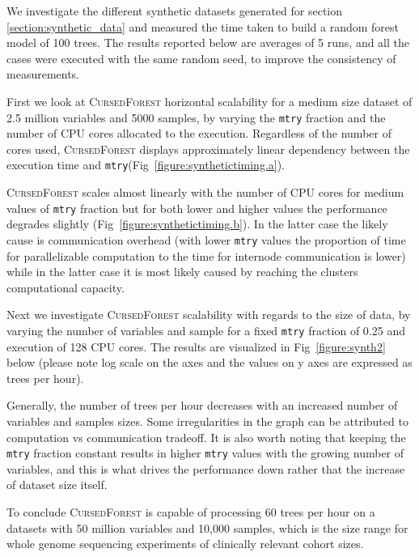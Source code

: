 \documentclass[10pt,letterpaper]{article}
\newcommand{\cursedforest}{\textsc{CursedForest}\xspace}
\newcommand{\mtry}{\texttt{mtry}\xspace}
\begin{document}
We investigate the different synthetic datasets generated for section \ref{section:synthetic_data} and measured the time
taken to build a random forest model of 100 trees. The results reported below are averages of 5 runs, and all the cases
were executed with the same random seed, to improve the consistency of measurements.

First we look at \cursedforest horizontal scalability for a medium size dataset of 2.5 million variables and 5000
samples, by varying the \mtry  fraction and the number of CPU cores allocated to the execution. 
Regardless of the number of cores used, \cursedforest displays approximately linear dependency between the execution
time and \mtry (Fig~\ref{figure:synthetictiming.a}).

\cursedforest scales almost linearly with the number of CPU cores for medium values of \mtry fraction but for both lower
and higher values the performance degrades slightly (Fig~\ref{figure:synthetictiming.b}). In the latter case the likely
cause is communication overhead (with lower \mtry values the proportion of time for parallelizable computation to the
time for internode communication is lower) while in the latter case it is most likely caused by reaching the clusters
computational capacity.

Next we investigate \cursedforest scalability with regards to the size of data, by varying the number of variables and
sample for a fixed \mtry fraction of 0.25 and execution of 128 CPU cores. The results are visualized in
Fig~\ref{figure:synth2} below (please note log scale on the axes and the values on y axes are expressed as trees per
hour).

Generally, the number of trees per hour decreases with an increased number of variables and samples sizes. Some
irregularities in the graph can be attributed to computation vs communication tradeoff. It is also worth noting that
keeping the \mtry fraction constant results in higher \mtry values with the growing number of variables, and this is
what drives the performance down rather that the increase of dataset size itself.

To conclude \cursedforest is capable of processing 60 trees per hour on a datasets with 50 million variables and 10,000
samples, which is the size range for whole genome sequencing experiments of clinically relevant cohort sizes.
\end{document}

